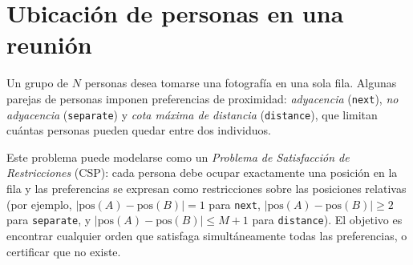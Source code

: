 
\section{Ubicación de personas en una reunión}\label{sec:05-reunion}
Un grupo de \(N\) personas desea tomarse una fotografía en una sola fila. Algunas parejas de personas imponen preferencias de proximidad: \emph{adyacencia} (\texttt{next}), \emph{no adyacencia} (\texttt{separate}) y \emph{cota máxima de distancia} (\texttt{distance}), que limitan cuántas personas pueden quedar entre dos individuos.

Este problema puede modelarse como un \emph{Problema de Satisfacción de Restricciones} (CSP): cada persona debe ocupar exactamente una posición en la fila y las preferencias se expresan como restricciones sobre las posiciones relativas (por ejemplo, \(|\mathrm{pos}(A)-\mathrm{pos}(B)|=1\) para \texttt{next}, \(|\mathrm{pos}(A)-\mathrm{pos}(B)|\ge 2\) para \texttt{separate}, y \(|\mathrm{pos}(A)-\mathrm{pos}(B)|\le M+1\) para \texttt{distance}). El objetivo es encontrar cualquier orden que satisfaga simultáneamente todas las preferencias, o certificar que no existe.